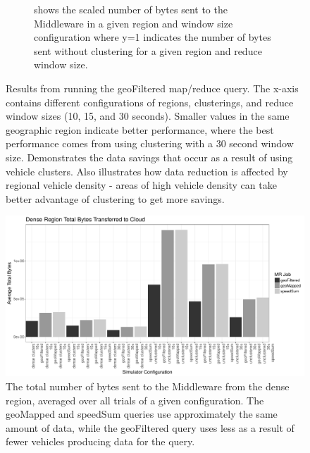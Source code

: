 \documentclass{thesis}
\begin{document}
\begin{figure}
\begin{subfigure}[h]{0.45\textwidth}
            \caption{shows the scaled number of bytes sent to the Middleware in a given region and window size
            configuration where y=1 indicates the number of bytes sent without clustering for a given region
            and reduce window size.}
        \end{subfigure}
        \caption{Results from running the geoFiltered map/reduce query. The x-axis contains different
            configurations of regions, clusterings, and reduce window sizes (10, 15, and 30 seconds). Smaller
            values in the same geographic region indicate better performance, where the best performance
            comes from using clustering with a 30 second window size. Demonstrates the data savings that occur as a result of using
            vehicle clusters. Also illustrates how data reduction is affected by regional vehicle
            density - areas of high vehicle density can take better advantage of clustering to get more savings.}
    \end{figure}

    \begin{figure}
            \includegraphics[width=\textwidth]{binImages/denseConfigs.pdf}
            \caption{The total number of bytes sent to the Middleware from the dense region, averaged over all trials of a given configuration.
                The geoMapped and speedSum queries use approximately the same amount of data, while the geoFiltered
                query uses less as a result of fewer vehicles producing data for the query.}
    \end{figure}
\end{document}
